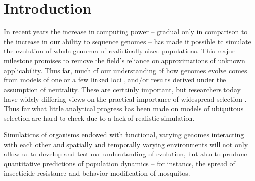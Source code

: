 \documentclass{bioinfo}
\begin{document}
\maketitle

\section{Introduction}


In recent years the increase in computing power --
gradual only in comparison to the increase in our ability to sequence genomes --
has made it possible to simulate the evolution of whole genomes of realistically-sized populations.
This major milestone promises to remove the field's reliance on approximations of unknown applicability.
Thus far, much of our understanding of how genomes evolve
comes from models of one or a few linked loci \citep{ewens},
and/or results derived under the assumption of neutrality.
These are certainly important, but researchers today have widely differing views
on the practical importance of widespread selection \citep{encode,graur,backgroundsel}.
Thus far what little analytical progress has been made on models of ubiquitous selection
are hard to check due to a lack of realistic simulation.

Simulations of organisms endowed with functional, varying genomes
interacting with each other and spatially and temporally varying environments
will not only allow us to develop and test our understanding of evolution,
but also to produce quantitative predictions of population dynamics --
for instance, the spread of insecticide resistance and behavior modification of mosquitos.
\end{document}
